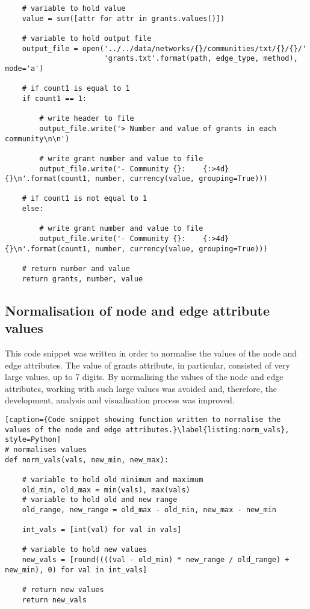 \begin{lstlisting}
    # variable to hold value
    value = sum([attr for attr in grants.values()])

    # variable to hold output file
    output_file = open('../../data/networks/{}/communities/txt/{}/{}/'
                       'grants.txt'.format(path, edge_type, method), mode='a')

    # if count1 is equal to 1
    if count1 == 1:

        # write header to file
        output_file.write('> Number and value of grants in each community\n\n')

        # write grant number and value to file
        output_file.write('- Community {}:    {:>4d} {}\n'.format(count1, number, currency(value, grouping=True)))

    # if count1 is not equal to 1
    else:

        # write grant number and value to file
        output_file.write('- Community {}:    {:>4d} {}\n'.format(count1, number, currency(value, grouping=True)))

    # return number and value
    return grants, number, value
\end{lstlisting}

\subsection{Normalisation of node and edge attribute values}

This code snippet was written in order to normalise the values of the node and edge attributes. The value of grants attribute, in particular, consisted of very large values, up to 7 digits. By normalising the values of the node and edge attributes, working with such large values was avoided and, therefore, the development, analysis and visualisation process was improved.

\begin{lstlisting}[caption={Code snippet showing function written to normalise the values of the node and edge attributes.}\label{listing:norm_vals}, style=Python]
# normalises values
def norm_vals(vals, new_min, new_max):

    # variable to hold old minimum and maximum
    old_min, old_max = min(vals), max(vals)
    # variable to hold old and new range
    old_range, new_range = old_max - old_min, new_max - new_min

    int_vals = [int(val) for val in vals]

    # variable to hold new values
    new_vals = [round((((val - old_min) * new_range / old_range) + new_min), 0) for val in int_vals]

    # return new values
    return new_vals
\end{lstlisting}

